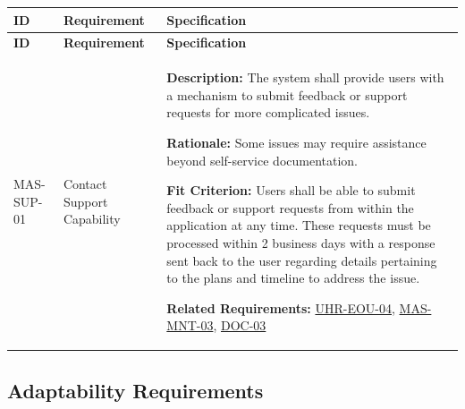 \documentclass[12pt]{article}
\begin{document}
\small
\setlength{\tabcolsep}{4pt}
\begin{xltabular}{\textwidth}{|p{2.6cm}|p{3.4cm}|X|}
\hline
\textbf{ID} & \textbf{Requirement} & \textbf{Specification} \\
\hline
\endfirsthead
\hline
\textbf{ID} & \textbf{Requirement} & \textbf{Specification} \\
\hline
\endhead

MAS-SUP-01\hypertarget{req:MAS-SUP-01}{} &
Contact Support Capability &
\textbf{Description:} The system shall provide users with a mechanism to submit feedback or support requests for more complicated issues.

\textbf{Rationale:} Some issues may require assistance beyond self-service documentation.

\textbf{Fit Criterion:} Users shall be able to submit feedback or support requests from within the application at any time. These requests must be processed within 2 business days with a response sent back to the user regarding details pertaining to the plans and timeline to address the issue.

\textbf{Related Requirements:} \hyperlink{req:UHR-EOU-04}{UHR-EOU-04}, \hyperlink{req:MAS-MNT-03}{MAS-MNT-03}, \hyperlink{req:DOC-03}{DOC-03}\\
\hline

\end{xltabular}

\subsection{Adaptability Requirements}
\end{document}
